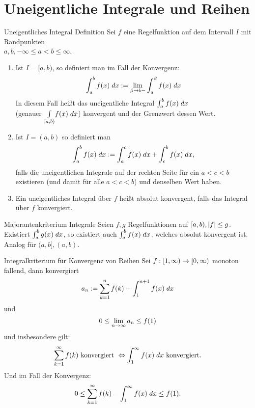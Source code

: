 \documentclass[main.tex]{subfiles}
\begin{document}
\section*{Uneigentliche Integrale und Reihen}

\begin{karte}{Uneigentliches Integral Definition}
    Sei \(f\) eine Regelfunktion auf dem Intervall \(I\) 
    mit Randpunkten \\
    \( a, b, -\infty \leq a < b \leq \infty \).
    \begin{enumerate}
        \item Ist \( I=[a,b) \), so definiert man im 
        Fall der Konvergenz:
        \[ \integral{f(x)}{a}{b} 
        := \limesx{\beta}{b-} \integral{f(x)}{a}{\beta} \]
        In diesem Fall heißt das uneigentliche Integral 
        \( \integral{f(x)}{a}{b} \) \\
        (genauer \( \underset{[a,b)}{\int} f(x) \dx \)) konvergent 
        und der Grenzwert dessen Wert.
        \item Ist \( I =(a,b) \) so definiert man
        \[ \integral{f(x)}{a}{b} 
        := \integral{f(x)}{a}{c} 
        + \integral{f(x)}{c}{b}, \]
        falls die uneigentlichen Integrale auf der rechten
        Seite für ein \(a < c < b\) existieren (und damit
        für alle \( a < c < b \)) und denselben Wert haben.
        \item Ein uneigentliches Integral über \(f\) 
        heißt absolut konvergent, falls das Integral 
        über \(f\) konvergiert.
    \end{enumerate}
\end{karte}

\begin{karte}{Majorantenkriterium Integrale}
    Seien \( f,g \) Regelfunktionen auf 
    \( [a,b), \abs{f} \leq g \). 
    Existiert \( \integral{g(x)}{a}{b} \), so existiert 
    auch \( \integral{f(x)}{a}{b} \), welches
    absolut konvergent ist.\\
    Analog für \( (a,b], (a,b) \).
\end{karte}

\begin{karte}{Integralkriterium für Konvergenz von Reihen}
    Sei \( \abb{f}{[1,\infty)}{[0,\infty)} \) monoton 
    fallend, dann konvergiert 
    \[ a_n := \sum_{k=1}^n f(k) 
    - \integral{f(x)}{1}{n+1} \]    
    und 
    \[ 0 \leq \limes{n} a_n \leq f(1) \]
    und insbesondere gilt:
    \[ \sum_{k=1}^\infty f(k) \text{ konvergiert }
    \Leftrightarrow \integral{f(x)}{1}{\infty} 
    \text{ konvergiert}. \]
    Und im Fall der Konvergenz:
    \[ 0 \leq \sum_{k=1}^\infty f(k) - \integral{f(x)}{1}{\infty} 
    \leq f(1). \]
\end{karte}
\end{document}
